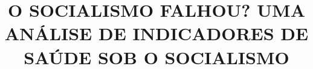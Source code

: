 \documentclass{novel}
\title     { O SOCIALISMO FALHOU? UMA ANÁLISE DE INDICADORES DE SAÚDE SOB O SOCIALISMO}
\subtitle  {}
\begin{document}
\toc

\end{document}
